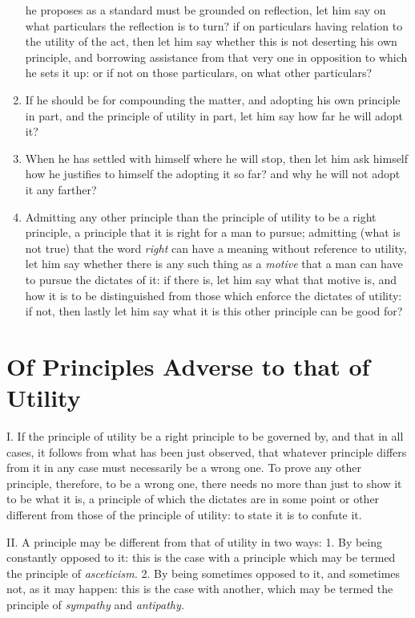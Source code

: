 \documentclass[12pt]{report}
\begin{document}
\begin{enumerate}
he proposes as a standard must be grounded on reflection, let him say on
what particulars the reflection is to turn? if on particulars having
relation to the utility of the act, then let him say whether this is not
deserting his own principle, and borrowing assistance from that very one
in opposition to which he sets it up: or if not on those particulars, on
what other particulars?
	\item If he should be for compounding the matter, and adopting his own
principle in part, and the principle of utility in part, let him say how
far he will adopt it?
	\item When he has settled with himself where he will stop, then let him ask
himself how he justifies to himself the adopting it so far? and why he
will not adopt it any farther?
	\item Admitting any other principle than the principle of utility to be a
right principle, a principle that it is right for a man to pursue;
admitting (what is not true) that the word \emph{right} can have a
meaning without reference to utility, let him say whether there is any
such thing as a \emph{motive} that a man can have to pursue the dictates
of it: if there is, let him say what that motive is, and how it is to be
distinguished from those which enforce the dictates of utility: if not,
then lastly let him say what it is this other principle can be good for?
\end{enumerate}

\chapter{Of Principles Adverse to that of Utility}

I. If the principle of utility be a right principle to be governed by,
and that in all cases, it follows from what has been just observed, that
whatever principle differs from it in any case must necessarily be a
wrong one. To prove any other principle, therefore, to be a wrong one,
there needs no more than just to show it to be what it is, a principle
of which the dictates are in some point or other different from those of
the principle of utility: to state it is to confute it.

II. A principle may be different from that of utility in two ways: 1. By
being constantly opposed to it: this is the case with a principle which
may be termed the principle of \emph{asceticism.} 2. By being sometimes
opposed to it, and sometimes not, as it may happen: this is the case
with another, which may be termed the principle of \emph{sympathy} and
\emph{antipathy.} \emph{}
\end{document}
